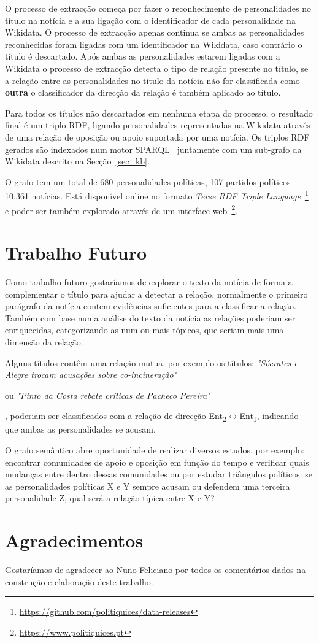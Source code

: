 \documentclass[a4paper, twocolumn, 11pt, twoside]{article}
\begin{document}
{{O processo de extracção começa por fazer o reconhecimento de personalidades no título na notícia e a sua ligação com o identificador de cada personalidade na Wikidata. O processo de extracção apenas continua se ambas as personalidades reconhecidas foram ligadas com um identificador na Wikidata, caso contrário o título é descartado.  Após ambas as personalidades estarem ligadas com a Wikidata o processo de extracção detecta o tipo de relação presente no título, se a relação entre as personalidades no título da notícia não for classificada como \textbf{outra} o classificador da direcção da relação é também aplicado ao título. 

Para todos os títulos não descartados em nenhuma etapa do processo, o resultado final é um triplo RDF, ligando personalidades representadas na Wikidata através de uma relação de oposição ou apoio suportada por uma notícia. Os triplos RDF gerados são indexados num motor SPARQL~\citep{jena2015free} juntamente com um sub-grafo da Wikidata descrito na Secção~\ref{sec_kb}.

O grafo tem um total de 680 personalidades políticas, 107 partidos políticos 10.361 notícias. Está disponível online no formato \textit{Terse RDF Triple Language}~\footnote{\url{https://github.com/politiquices/data-releases}} e poder ser também explorado através de um interface web~\footnote{\url{https://www.politiquices.pt}}.

\section{Trabalho Futuro}
\label{sec:future_work}

Como trabalho futuro gostaríamos de explorar o texto da notícia de forma a complementar o título para ajudar a detectar a relação, normalmente o primeiro parágrafo da notícia contem evidências suficientes para a classificar a relação. Também com base numa análise do texto da notícia as relações poderiam ser enriquecidas, categorizando-as num ou mais tópicos, que seriam mais uma dimensão da relação.

Alguns títulos contêm uma relação mutua, por exemplo os títulos: \textit{"Sócrates e Alegre trocam acusações sobre co-incineração"}} ou \textit{"Pinto da Costa rebate críticas de Pacheco Pereira"}}, poderiam ser classificados com a relação de direcção Ent\textsubscript{2}$\leftrightarrow$Ent\textsubscript{1}, indicando que ambas as personalidades se acusam.

O grafo semântico abre oportunidade de realizar diversos estudos, por exemplo: encontrar comunidades de apoio e oposição em função do tempo e verificar quais mudanças entre dentro dessas comunidades ou por estudar triângulos políticos: se as personalidades políticas X e Y sempre acusam ou defendem uma terceira personalidade Z, qual será a relação típica entre X e Y?

\section*{Agradecimentos}

Gostaríamos de agradecer ao Nuno Feliciano por todos os comentários dados na construção e elaboração deste trabalho. %


\end{document}
